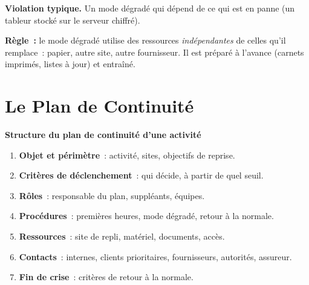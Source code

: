 \begin{boxalert}
\textbf{Violation typique.} Un mode dégradé qui dépend de ce qui est en
panne (un tableur stocké sur le serveur chiffré).

\smallskip
\textbf{Règle~:} le mode dégradé utilise des ressources \emph{indépendantes}
de celles qu'il remplace~: papier, autre site, autre fournisseur. Il est
préparé à l'avance (carnets imprimés, listes à jour) et entraîné.
\end{boxalert}

\section{Le Plan de Continuité}
\label{sec:c18-plan}

\begin{boxprocedure}
\textbf{Structure du plan de continuité d'une activité}
\begin{enumerate}
    \item \textbf{Objet et périmètre}~: activité, sites, objectifs de
          reprise.
    \item \textbf{Critères de déclenchement}~: qui décide, à partir de quel
          seuil.
    \item \textbf{Rôles}~: responsable du plan, suppléants, équipes.
    \item \textbf{Procédures}~: premières heures, mode dégradé, retour à la
          normale.
    \item \textbf{Ressources}~: site de repli, matériel, documents, accès.
    \item \textbf{Contacts}~: internes, clients prioritaires, fournisseurs,
          autorités, assureur.
    \item \textbf{Fin de crise}~: critères de retour à la normale.
\end{enumerate}
\end{boxprocedure}

